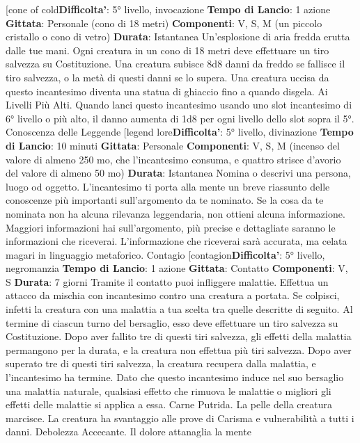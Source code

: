 \begin{multicols}{2}
[cone of cold\textbf{Difficolta'}:
5° livello, invocazione
\textbf{Tempo di Lancio}: 1 azione
\textbf{Gittata}: Personale (cono di 18 metri)
\textbf{Componenti}: V, S, M (un piccolo cristallo o cono di
vetro)
\textbf{Durata}: Istantanea
Un’esplosione di aria fredda erutta dalle tue mani. Ogni
creatura in un cono di 18 metri deve effettuare un tiro
salvezza su Costituzione. Una creatura subisce 8d8
danni da freddo se fallisce il tiro salvezza, o la metà di
questi danni se lo supera.
Una creatura uccisa da questo incantesimo diventa una
statua di ghiaccio fino a quando disgela.
Ai Livelli Più Alti. Quando lanci questo incantesimo
usando uno slot incantesimo di 6° livello o più alto, il
danno aumenta di 1d8 per ogni livello dello slot sopra il
5°.
Conoscenza delle Leggende
[legend lore\textbf{Difficolta'}:
5° livello, divinazione
\textbf{Tempo di Lancio}: 10 minuti
\textbf{Gittata}: Personale
\textbf{Componenti}: V, S, M (incenso del valore di almeno
250 mo, che l’incantesimo consuma, e quattro strisce
d’avorio del valore di almeno 50 mo)
\textbf{Durata}: Istantanea
Nomina o descrivi una persona, luogo od oggetto.
L’incantesimo ti porta alla mente un breve riassunto
delle conoscenze più importanti sull’argomento da te
nominato. Se la cosa da te nominata non ha alcuna
rilevanza leggendaria, non ottieni alcuna informazione.
Maggiori informazioni hai sull’argomento, più precise e
dettagliate saranno le informazioni che riceverai.
L’informazione che riceverai sarà accurata, ma celata
magari in linguaggio metaforico.
Contagio
[contagion\textbf{Difficolta'}:
5° livello, negromanzia
\textbf{Tempo di Lancio}: 1 azione
\textbf{Gittata}: Contatto
\textbf{Componenti}: V, S
\textbf{Durata}: 7 giorni
Tramite il contatto puoi infliggere malattie. Effettua un
attacco da mischia con incantesimo contro una creatura
a portata. Se colpisci, infetti la creatura con una
malattia a tua scelta tra quelle descritte di seguito.
Al termine di ciascun turno del bersaglio, esso deve
effettuare un tiro salvezza su Costituzione. Dopo aver
fallito tre di questi tiri salvezza, gli effetti della malattia
permangono per la durata, e la creatura non effettua più
tiri salvezza. Dopo aver superato tre di questi tiri
salvezza, la creatura recupera dalla malattia, e
l’incantesimo ha termine.
Dato che questo incantesimo induce nel suo bersaglio
una malattia naturale, qualsiasi effetto che rimuova le
malattie o migliori gli effetti delle malattie si applica a
essa.
Carne Putrida. La pelle della creatura marcisce. La
creatura ha svantaggio alle prove di Carisma e
vulnerabilità a tutti i danni.
Debolezza Accecante. Il dolore attanaglia la mente

\end{multicols}
